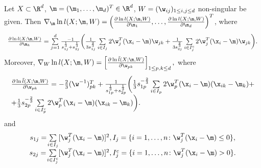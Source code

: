 \begin{theorem}\label{ther:grad}
Let $X \subset \R^d$, $\m = (\m_1, \ldots, \m_d)^T \in \R^d$, $W = (\w_{ij})_{1 \leq i,j \leq d}$ non-singular be given. 
Then
$\nabla_{\m}  \ln {l}(X;\m,W) = \left(  \frac{\partial \ln {l}(X;\m,W)}{\partial \m_1}, \ldots, \frac{\partial \ln {l}(X;\m,W)}{\partial \m_d} \right)^T$,
where
$$
\begin{array}{l}
\frac{\partial \ln {l}(X;\m,W)}{\partial \m_k} =
\sum \limits_{j=1}^d \frac{-1}{{s}_{1j}^{\frac{1}{3}} + {s}_{2j}^{\frac{1}{3}}} \bigg(
\frac{1}{3 {s}_{1j}^{\frac{2}{3}}} \sum \limits_{i \in I_j} 2 \w_j^T (\x_i - \m)  \w_{jk} + %
\frac{1}{3 {s}_{2j}^{\frac{2}{3}}} \sum \limits_{i \in I_j^c} 2 \w_j^T (\x_i - \m)  \w_{jk}
\bigg).
\end{array}
$$
Moreover,
$
\nabla_{W} \ln {l}(X;\m,W) = \left[ \frac{\partial \ln \tilde{l}(X;\m,W)}{\partial \w_{pk}}  \right]_{1 \leq p,k \leq d},
$
where
$$
\begin{array}{l}
\frac{\partial \ln \tilde{l}(X;\m,W)}{\partial \w_{pk}}  = 
-\frac{2}{3}  (\w^{-1})^T_{pk} +%
\frac{1}{{s}_{1p}^{\frac{1}{3}} +{s}_{2p}^{\frac{1}{3}}} 
\bigg(
\frac{1}{3} {s}_{1p}^{-\frac{2}{3}}  \sum \limits_{i \in {I}_p} 2 \w^T_p  (\x_i - \m) (\x_{ik} - \m_k) + \\[6pt]
+ \frac{1}{3} {s}_{2p}^{-\frac{2}{3}}  \sum \limits_{i \in {I}_p^c} 2 \w^T_p  (\x_i - \m) (\x_{ik} - \m_k) \bigg).
\end{array}
$$
and
$$
\begin{array}{c}
{s}_{1j}= \! \sum\limits_{i \in I_j}[ \w_{j}^T (\x_i-\m)]^2, {I}_j=\{ i = 1,\ldots,n \colon \w_{j}^T (\x_i-\m) \leq 0 \},
\\[1ex]
{s}_{2j}= \! \sum\limits_{i \in I_j^c}[ \w_{j}^T (\x_i-\m)]^2,  {I}_j^c=\{ i = 1,\ldots,n \colon  \w_{j}^T (\x_i-\m) > 0 \}.
\end{array}
$$
\end{theorem}

